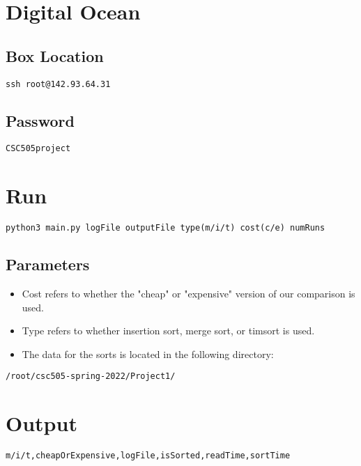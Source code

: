 \documentclass[11pt]{article}
\author{DESKTOP-OEFS7VE}
\date{\today}
\title{}
\begin{document}
\tableofcontents

\section{Digital Ocean}
\label{sec:orgaaabe67}
\subsection{Box Location}
\label{sec:org4b01ac4}
\lstset{language=shell,label= ,caption= ,captionpos=b,numbers=none}
\begin{lstlisting}
ssh root@142.93.64.31
\end{lstlisting}
\subsection{Password}
\label{sec:org1dcaa66}
\lstset{language=shell,label= ,caption= ,captionpos=b,numbers=none}
\begin{lstlisting}
CSC505project
\end{lstlisting}
\section{Run}
\label{sec:org2b73ec1}
\lstset{language=shell,label= ,caption= ,captionpos=b,numbers=none}
\begin{lstlisting}
python3 main.py logFile outputFile type(m/i/t) cost(c/e) numRuns
\end{lstlisting}
\subsection{Parameters}
\label{sec:orgd2bad98}
\begin{itemize}
\item Cost refers to whether the "cheap" or "expensive" version of our comparison is used.
\item Type refers to whether insertion sort, merge sort, or timsort is used.
\item The data for the sorts is located in the following directory:
\end{itemize}
\lstset{language=shell,label= ,caption= ,captionpos=b,numbers=none}
\begin{lstlisting}
/root/csc505-spring-2022/Project1/
\end{lstlisting}
\section{Output}
\label{sec:org4077bc2}
\lstset{language=shell,label= ,caption= ,captionpos=b,numbers=none}
\begin{lstlisting}
m/i/t,cheapOrExpensive,logFile,isSorted,readTime,sortTime
\end{lstlisting}
\end{document}
